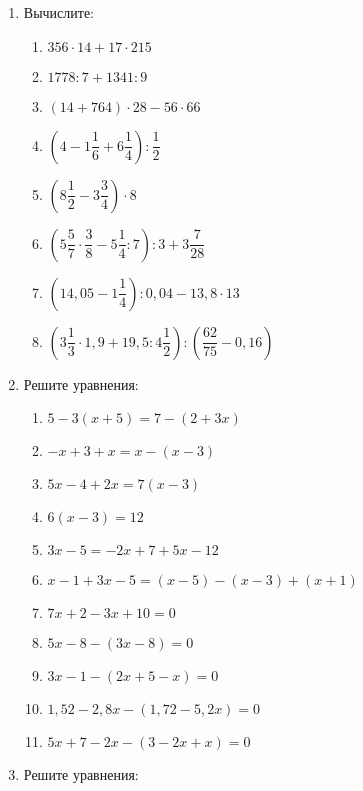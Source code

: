 \documentclass[12pt, a4paper]{article}
\begin{document}
	
	\begin{enumerate}
				\item \textit{} Вычислите:
				\begin{multicols}{2}
					\begin{enumerate}[label=\asbuk*)]
						\item $356\cdot14+17\cdot215$
						\item $1778:7+1341:9$
						\item $(14+764)\cdot28-56\cdot66$
						\item $\left(4-1\dfrac{1}{6}+6\dfrac{1}{4}\right):\dfrac{1}{2}$
						\item $\left(8\dfrac{1}{2}-3\dfrac{3}{4}\right)\cdot8$
						\item $\left(5\dfrac{5}{7}\cdot\dfrac{3}{8}-5\dfrac{1}{4}:7\right):3+3\dfrac{7}{28}$
						\item $\left( 14,05-1\dfrac{1}{4}\right):0,04-13,8\cdot13 $
						\item $\left(3\dfrac{1}{3}\cdot1,9+19,5:4\dfrac{1}{2}\right):\left(\dfrac{62}{75}-0,16\right)$
					\end{enumerate}
				\end{multicols}
				\item \textit{} Решите уравнения:
				\begin{multicols}{2}
					\begin{enumerate}[label=\asbuk*)]
						\item $5-3(x+5)=7-(2+3x)$
						\item $-x+3+x=x-(x-3)$
						\item $5x-4+2x=7(x-3)$
						\item $6(x-3)=12$
						\item $3x-5=-2x+7+5x-12$
						\item $x-1+3x-5=(x-5)-(x-3)+(x+1)$
						\item $7x+2-3x+10=0$
						\item $5x-8-(3x-8)=0$
						\item $3x-1-(2x+5-x)=0$
						\item $1,52-2,8x-(1,72-5,2x)=0$
						\item $5x+7-2x-(3-2x+x)=0$
					\end{enumerate}
				\end{multicols}
				\item \textit{} Решите уравнения:
				\begin{multicols}{2}
					\begin{enumerate}[label=\asbuk*)]

\end{enumerate}
\end{multicols}
\end{enumerate}
\end{document}
